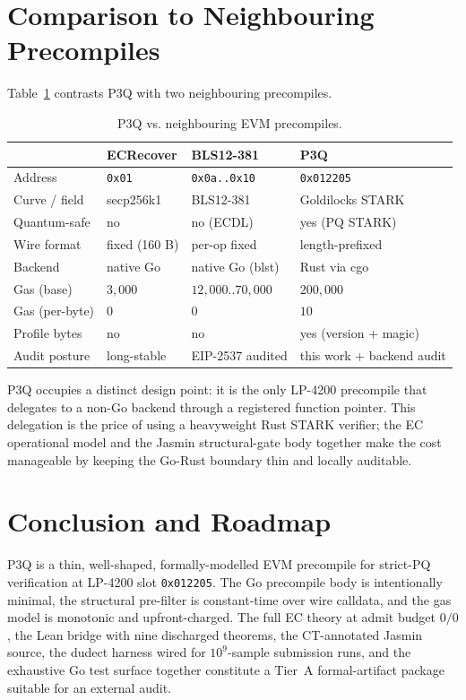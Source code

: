 \documentclass[11pt,a4paper]{article}
\begin{document}
\section{Comparison to Neighbouring Precompiles}\label{sec:comparison}

Table~\ref{tab:cmp} contrasts P3Q with two neighbouring precompiles.

\begin{table}[h]
\centering
\caption{P3Q vs. neighbouring EVM precompiles.}
\label{tab:cmp}
\small
\begin{tabular}{p{2.5cm}p{3cm}p{3cm}p{3cm}}
\toprule
& ECRecover & BLS12-381 & P3Q \\
\midrule
Address & \texttt{0x01} & \texttt{0x0a..0x10} & \texttt{0x012205} \\
Curve / field & secp256k1 & BLS12-381 & Goldilocks STARK \\
Quantum-safe & no & no (ECDL) & yes (PQ STARK) \\
Wire format & fixed (160 B) & per-op fixed & length-prefixed \\
Backend & native Go & native Go (blst) & Rust via cgo \\
Gas (base) & $3{,}000$ & $12{,}000..70{,}000$ & $200{,}000$ \\
Gas (per-byte) & $0$ & $0$ & $10$ \\
Profile bytes & no & no & yes (version + magic) \\
Audit posture & long-stable & EIP-2537 audited & this work + backend audit \\
\bottomrule
\end{tabular}
\end{table}

P3Q occupies a distinct design point: it is the only LP-4200
precompile that delegates to a non-Go backend through a registered
function pointer. This delegation is the price of using a
heavyweight Rust STARK verifier; the EC operational model and the
Jasmin structural-gate body together make the cost manageable by
keeping the Go-Rust boundary thin and locally auditable.

\section{Conclusion and Roadmap}\label{sec:conclusion}

P3Q is a thin, well-shaped, formally-modelled EVM precompile for
strict-PQ verification at LP-4200 slot \texttt{0x012205}. The Go
precompile body is intentionally minimal, the structural pre-filter
is constant-time over wire calldata, and the gas model is monotonic
and upfront-charged. The full EC theory at admit budget $0/0$, the
Lean bridge with nine discharged theorems, the CT-annotated Jasmin
source, the dudect harness wired for $10^9$-sample submission runs,
and the exhaustive Go test surface together constitute a Tier~A
formal-artifact package suitable for an external audit.
\end{document}
